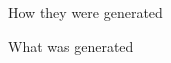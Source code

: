 \section{\color{blue}{Synthetic Models}}

How they were generated



What was generated


























